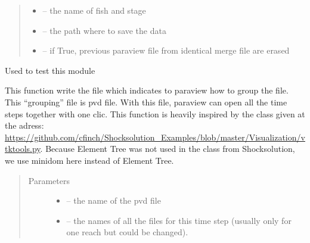 \documentclass[letterpaper,10pt,english]{sphinxmanual}
\begin{document}
\begin{fulllineitems}
\begin{quote}
\begin{description}
\begin{itemize}
\item {} 
 -- the name of fish and stage

\item {} 
 -- the path where to save the data

\item {} 
 -- if True, previous paraview file from identical merge file are erased

\end{itemize}

\end{description}\end{quote}

\end{fulllineitems}


\begin{fulllineitems}
\label{\detokenize{index:src.new_create_vtk.main}}
Used to test this module

\end{fulllineitems}


\begin{fulllineitems}
\label{\detokenize{index:src.new_create_vtk.writePVD}}
This function write the file which indicates to paraview how to group the file. This ``grouping'' file is pvd file.
With this file, paraview can open all the time steps together with one clic. This function is heavily inspired
by the class given at the adress:
\url{https://github.com/cfinch/Shocksolution\_Examples/blob/master/Visualization/vtktools.py}. Because Element Tree
was not used in the class from Shocksolution, we use minidom here instead of Element Tree.
\begin{quote}\begin{description}
\item[{Parameters}] \leavevmode\begin{itemize}
\item {} 
 -- the name of the pvd file

\item {} 
 -- the names of all the files for this time step (usually only for one reach but could be changed).

\end{itemize}

\end{description}\end{quote}

\end{fulllineitems}
\end{document}
